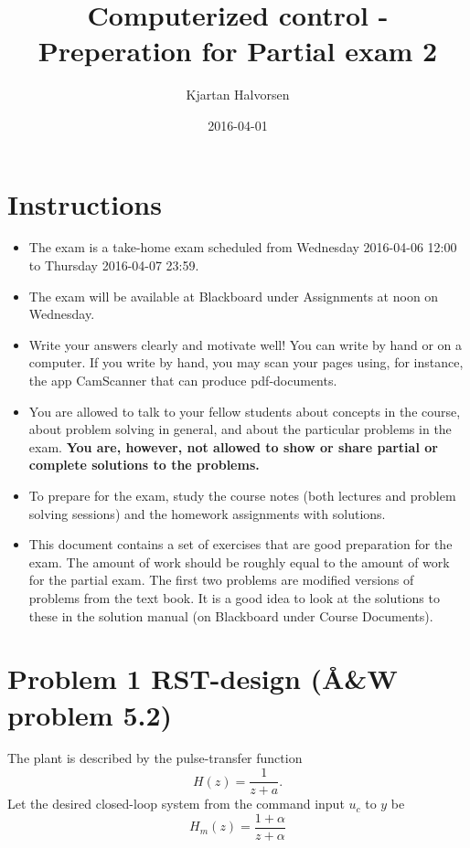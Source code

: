 \documentclass{scrartcl}
\author{Kjartan Halvorsen}
\date{2016-04-01}
\title{Computerized control - Preperation for Partial exam 2}
\begin{document}
\maketitle

\section*{Instructions}
\label{sec:orgheadline1}
\begin{itemize}
\item The exam is a take-home exam scheduled from Wednesday 2016-04-06 12:00 to Thursday 2016-04-07 23:59.
\item The exam will be available at Blackboard under Assignments at noon on Wednesday.
\item Write your answers clearly and motivate well! You can write by hand or on a computer. If you write by hand, you may scan your pages using, for instance, the app CamScanner that can produce pdf-documents.
\item You are allowed to talk to your fellow students about concepts in the course, about problem solving in general, and about the particular problems in the exam. \textbf{You are, however, not allowed to show or share partial or complete solutions to the problems.}
\item To prepare for the exam, study the course notes (both lectures and problem solving sessions) and the homework assignments with solutions.
\item This document contains a set of exercises that are good preparation for the exam. The amount of work should be roughly equal to the amount of work for the partial exam. The first two problems are modified versions of problems from the text book. It is a good idea to look at the solutions to these in the solution manual (on Blackboard under Course Documents).
\end{itemize}

\section*{Problem 1 RST-design (Å\&W problem 5.2)}
\label{sec:orgheadline4}
The plant is described by the pulse-transfer function
\begin{equation}
H(z) = \frac{1}{z+a}.
\end{equation}
Let the desired closed-loop system from the command input \(u_c\) to \(y\) be
\begin{equation}
H_m(z) = \frac{1+\alpha}{z+\alpha}
\end{equation}
\end{document}
